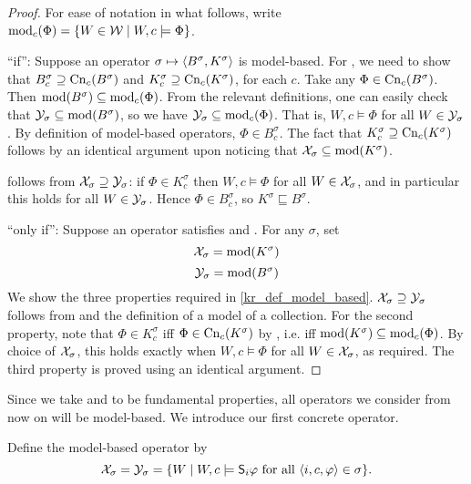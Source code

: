 \begin{proof}
    For ease of notation in what follows, write $\operatorname{mod}_c(\Phi) = \{W \in \mathcal{W}
    \mid W, c \models \Phi\}$.

``if'': Suppose an operator $\sigma \mapsto \langle {B^\sigma, K^\sigma} \rangle$ is
model-based. For \closure{}, we need to show that $B^\sigma_c \supseteq
\operatorname{Cn}_c(B^\sigma)$ and $K^\sigma_c \supseteq \operatorname{Cn}_c(K^\sigma)$, for each $c$. Take
any $\Phi \in \operatorname{Cn}_c(B^\sigma)$. Then $\operatorname{mod}(B^\sigma) \subseteq \operatorname{mod}_c(\Phi)$.
From the relevant definitions, one can easily check that $\mathcal{Y}_\sigma \subseteq
\operatorname{mod}(B^\sigma)$, so we have $\mathcal{Y}_\sigma \subseteq \operatorname{mod}_c(\Phi)$. That is, $W,
c \models \Phi$ for all $W \in \mathcal{Y}_\sigma$. By definition of model-based
operators, $\Phi \in B^\sigma_c$. The fact that $K^\sigma_c \supseteq
\operatorname{Cn}_c(K^\sigma)$ follows by an identical argument upon noticing that $\mathcal{X}_\sigma
\subseteq \operatorname{mod}(K^\sigma)$.

\containment{} follows from $\mathcal{X}_\sigma \supseteq \mathcal{Y}_\sigma$: if $\Phi \in
K^\sigma_c$ then $W, c \models \Phi$ for all $W \in \mathcal{X}_\sigma$, and in
particular this holds for all $W \in \mathcal{Y}_\sigma$. Hence $\Phi \in B^\sigma_c$,
so $K^\sigma \sqsubseteq B^\sigma$.

``only if'': Suppose an operator satisfies \closure{} and
\containment{}. For any $\sigma$, set
\[
    \mathcal{X}_\sigma = \operatorname{mod}(K^\sigma)
\]
\[
    \mathcal{Y}_\sigma = \operatorname{mod}(B^\sigma)
\]
We show the three properties required in \cref{kr_def_model_based}.  $\mathcal{X}_\sigma
\supseteq \mathcal{Y}_\sigma$ follows from \containment{} and the definition of a
model of a collection. For the second property, note that $\Phi \in K^\sigma_c$
iff $\Phi \in \operatorname{Cn}_c(K^\sigma)$ by \closure{}, i.e. iff $\operatorname{mod}(K^\sigma)
\subseteq \operatorname{mod}_c(\Phi)$.  By choice of $\mathcal{X}_\sigma$, this holds exactly when
$W, c \models \Phi$ for all $W \in \mathcal{X}_\sigma$, as required. The third property
is proved using an identical argument.
\end{proof}

Since we take \closure{} and \containment{} to be fundamental properties, all
operators we consider from now on will be model-based.
%
We introduce our first concrete operator.

\begin{definition}
    \label{kr_def_weakop}
    Define the model-based operator \weakop{} by
    \[
        \mathcal{X}_\sigma = \mathcal{Y}_\sigma = \{
            W \mid W, c \models \mathsf{S}_i\varphi \text{ for all } \langle {i, c, \varphi} \rangle
            \in \sigma
        \}.
    \]
\end{definition}


